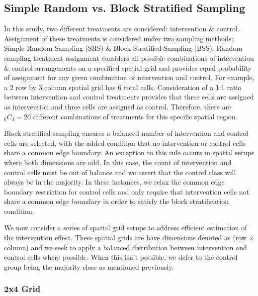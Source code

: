 \documentclass{article}[11pt]
\begin{document}
\subsection{Simple Random vs. Block Stratified Sampling}

In this study, two different treatments are considered: intervention $\&$ control. Assignment of these treatments is considered under two sampling methods: Simple Random Sampling (SRS) $\&$ Block Stratified Sampling (BSS). Random sampling treatment assignment considers all possible combinations of intervention $\&$ control arrangements on a specified spatial grid and provides equal probability of assignment for any given combination of intervention and control. For example, a 2 row by 3 column spatial grid has 6 total cells. Consideration of a 1:1 ratio between intervention and control treatments provides that three cells are assigned as intervention and three cells are assigned as control. Therefore, there are %
$_{6}C_{3}=20$ different combinations of treatments for this specific spatial region. 

Block stratified sampling ensures a balanced number of intervention and control cells are selected, with the added condition that no intervention or control cells share a common edge boundary. An exception to this rule occurs in spatial setups where both dimensions are odd. In this case, the count of intervention and control cells must be out of balance and we assert that the control class will always be in the majority. In these instances, we relax the common edge boundary restriction for control cells and only require that intervention cells not share a common edge boundary in order to satisfy the block stratification condition.

We now consider a series of spatial grid setups to address efficient estimation of the intervention effect. These spatial grids are have dimensions denoted as (row $\times$ column) and we seek to apply a balanced distribution between intervention and control cells where possible. When this isn't possible, we defer to the control group being the majority class as mentioned previously.

\subsubsection{2x4 Grid}
\end{document}
